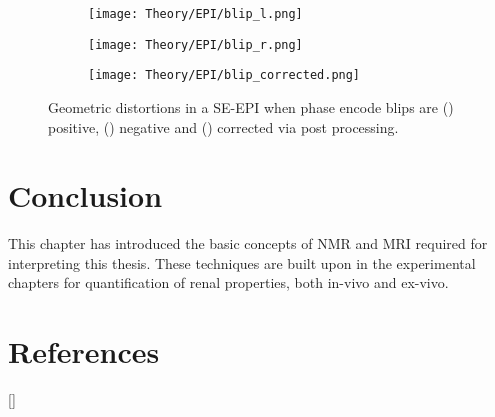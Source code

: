 \begin{figure}[H]
	\centering
	\begin{subfigure}[c]{0.30\textwidth}
		\centering
		\texttt{[image: Theory/EPI/blip\_l.png]}
		\caption{}
		\label{fig:theory_epi_blip_l}
	\end{subfigure}
	\hfill
	\begin{subfigure}[c]{0.30\textwidth}
		\centering
		\texttt{[image: Theory/EPI/blip\_r.png]}
		\caption{}
		\label{fig:theory_epi_blip_r}
	\end{subfigure}
	\hfill	
	\begin{subfigure}[c]{0.30\textwidth}
		\centering
		\texttt{[image: Theory/EPI/blip\_corrected.png]}
		\caption{}
		\label{fig:theory_epi_blip_corrected}
	\end{subfigure}
	\caption{Geometric distortions in a \ac{SE}-\ac{EPI} when phase encode blips are () positive, () negative and () corrected via post processing.}
	\label{fig:theory_epi_eddy}
\end{figure}

\section{Conclusion}
This chapter has introduced the basic concepts of \ac{NMR} and \ac{MRI} required for interpreting this thesis. These techniques are built upon in the experimental chapters for quantification of renal properties, both in-vivo and ex-vivo.

\newpage
\section{References}
[\refname]{}
\printbibliography